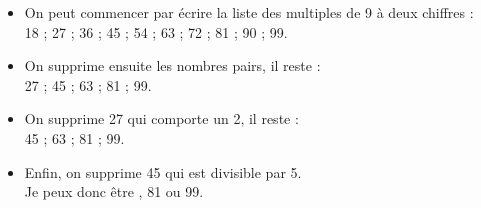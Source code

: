    \begin{itemize}
      \item On peut commencer par écrire la liste des multiples de 9 à deux chiffres : \\
         18 ; 27 ; 36 ; 45 ; 54 ; 63 ; 72 ; 81 ; 90 ; 99.
      \item On supprime ensuite les nombres pairs, il reste : \\
         27 ; 45 ; 63 ; 81 ; 99.
      \item On supprime 27 qui comporte un 2, il reste : \\
         45 ; 63 ; 81 ; 99. \\
      \item Enfin, on supprime 45 qui est divisible par 5. \\
         Je peux donc être {, 81 ou 99}.
   \end{itemize}
